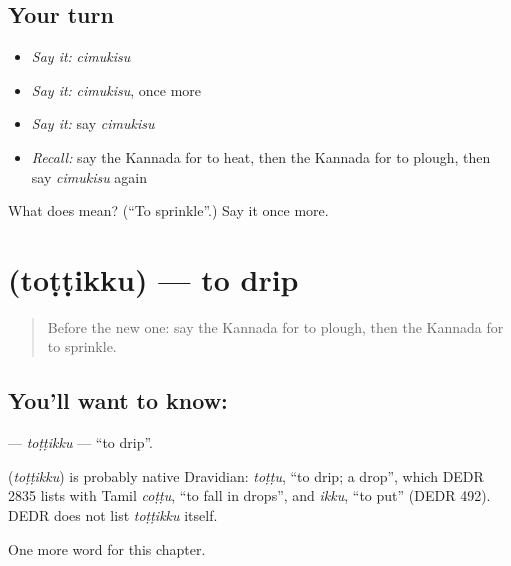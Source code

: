 \subsection*{Your turn}
\begin{itemize}
\raggedright
  \item \emph{Say it:} \emph{cimukisu}
  \item \emph{Say it:} \emph{cimukisu}, once more
  \item \emph{Say it:} say \emph{cimukisu}
  \item \emph{Recall:} say the Kannada for to heat, then the Kannada for to plough, then say \emph{cimukisu} again
\end{itemize}

\begin{tcolorbox}[breakable,colback=teal!4,colframe=teal!35!black,title={Before you move on}]
What does  mean? (\textquotedblleft{}To sprinkle\textquotedblright{}.) Say it once more.
\end{tcolorbox}
\section[\texorpdfstring{\kn{ತೊಟ್ಟಿಕ್ಕು} (toṭṭikku)}{ತೊಟ್ಟಿಕ್ಕು (toṭṭikku)}]{ (toṭṭikku) — to drip}

\label{lesson:KA-C166-tottikku}



\begin{quote}
Before the new one: say the Kannada for to plough, then the Kannada for to sprinkle.
\end{quote}

\subsection*{You'll want to know: }
\textbf{} — \emph{toṭṭikku} — \textquotedblleft{}to drip\textquotedblright{}.

\begin{cousinweb}
\textbf{} (\emph{toṭṭikku}) is probably native Dravidian: \emph{toṭṭu}, \textquotedblleft{}to drip; a drop\textquotedblright{}, which DEDR 2835 lists with Tamil \emph{coṭṭu}, \textquotedblleft{}to fall in drops\textquotedblright{}, and \emph{ikku}, \textquotedblleft{}to put\textquotedblright{} (DEDR 492). DEDR does not list \emph{toṭṭikku} itself.
\end{cousinweb}

\begin{grammarlens}[title={What you've built}]
One more word for this chapter.
\end{grammarlens}

